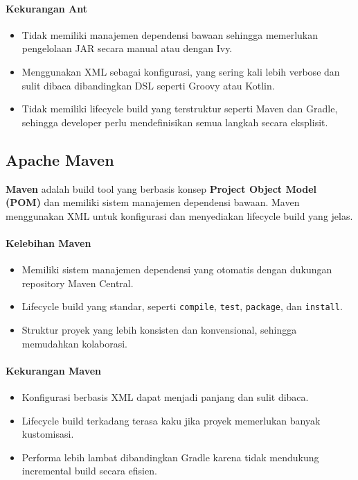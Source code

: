 \paragraph{Kekurangan Ant}
\begin{itemize}
	\item Tidak memiliki manajemen dependensi bawaan sehingga memerlukan pengelolaan JAR secara manual atau dengan Ivy.
	\item Menggunakan XML sebagai konfigurasi, yang sering kali lebih verbose dan sulit dibaca dibandingkan DSL seperti Groovy atau Kotlin.
	\item Tidak memiliki lifecycle build yang terstruktur seperti Maven dan Gradle, sehingga developer perlu mendefinisikan semua langkah secara eksplisit.
\end{itemize}

\subsection{Apache Maven}
\textbf{Maven} adalah build tool yang berbasis konsep \textbf{Project Object Model (POM)} dan memiliki sistem manajemen dependensi bawaan. Maven menggunakan XML untuk konfigurasi dan menyediakan lifecycle build yang jelas.

\paragraph{Kelebihan Maven}
\begin{itemize}
	\item Memiliki sistem manajemen dependensi yang otomatis dengan dukungan repository Maven Central.
	\item Lifecycle build yang standar, seperti \texttt{compile}, \texttt{test}, \texttt{package}, dan \texttt{install}.
	\item Struktur proyek yang lebih konsisten dan konvensional, sehingga memudahkan kolaborasi.
\end{itemize}

\paragraph{Kekurangan Maven}
\begin{itemize}
	\item Konfigurasi berbasis XML dapat menjadi panjang dan sulit dibaca.
	\item Lifecycle build terkadang terasa kaku jika proyek memerlukan banyak kustomisasi.
	\item Performa lebih lambat dibandingkan Gradle karena tidak mendukung incremental build secara efisien.
\end{itemize}

